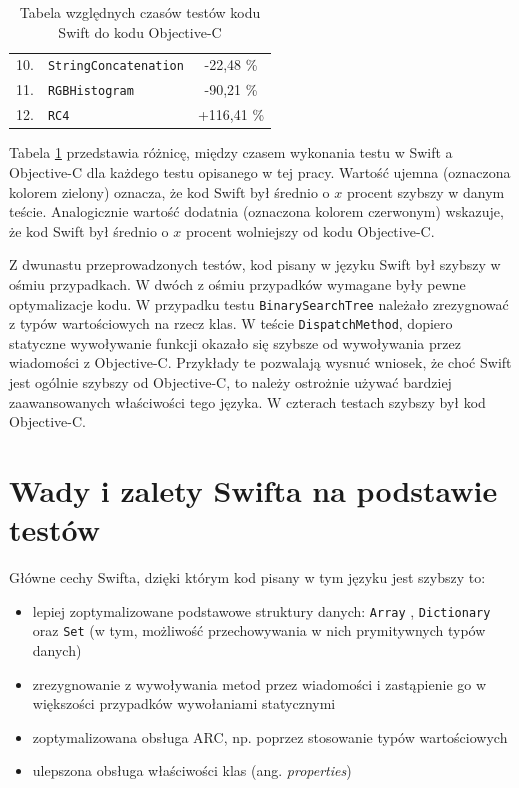 \documentclass[mgr, shortabstract]{iithesis}
\newcommand{\ang}[1]{ang. \textit{#1}}
\newcommand{\swiftinline}[1]{
    \texttt{#1}
}
\begin{document}
\begin{table}[!ht]
\begin{tabularx}{1.0\textwidth}{ rXc }
        10. & \texttt{StringConcatenation}                    & \textcolor{MTGreen}{-22,48 \%}    \\ 
        11. & \texttt{RGBHistogram}                           & \textcolor{MTGreen}{-90,21 \%}    \\ 
        12. & \texttt{RC4}                                    & \textcolor{MTRed}{+116,41 \%}     \\ 
        \hline
    \end{tabularx}
    \caption{Tabela względnych czasów testów kodu Swift do kodu Objective-C}
    \label{t:results}
\end{table}

Tabela \ref{t:results} przedstawia różnicę, między czasem wykonania testu w Swift a Objective-C dla każdego testu opisanego w tej pracy. Wartość ujemna (oznaczona kolorem zielony) oznacza, że kod Swift był średnio o $x$ procent szybszy w danym teście. Analogicznie wartość dodatnia (oznaczona kolorem czerwonym) wskazuje, że kod Swift był średnio o $x$ procent wolniejszy od kodu Objective-C.

Z dwunastu przeprowadzonych testów, kod pisany w języku Swift był szybszy w ośmiu przypadkach. W dwóch z ośmiu przypadków wymagane były pewne optymalizacje kodu. W przypadku testu \texttt{BinarySearchTree} należało zrezygnować z typów wartościowych na rzecz klas. W teście \texttt{DispatchMethod}, dopiero statyczne wywoływanie funkcji okazało się szybsze od wywoływania przez wiadomości z Objective-C. Przykłady te pozwalają wysnuć wniosek, że choć Swift jest ogólnie szybszy od Objective-C, to należy ostrożnie używać bardziej zaawansowanych właściwości tego języka. W czterach testach szybszy był kod Objective-C.

\section{Wady i zalety Swifta na podstawie testów}

Główne cechy Swifta, dzięki którym kod pisany w tym języku jest szybszy to:
\begin{itemize}
    \item lepiej zoptymalizowane podstawowe struktury danych: \swiftinline{Array}, \swiftinline{Dictionary} oraz \swiftinline{Set} (w tym, możliwość przechowywania w nich prymitywnych typów danych)
    \item zrezygnowanie z wywoływania metod przez wiadomości i zastąpienie go w większości przypadków wywołaniami statycznymi
    \item zoptymalizowana obsługa ARC, np. poprzez stosowanie typów wartościowych   
    \item ulepszona obsługa właściwości klas (\ang{properties})    
\end{itemize}
\end{document}

